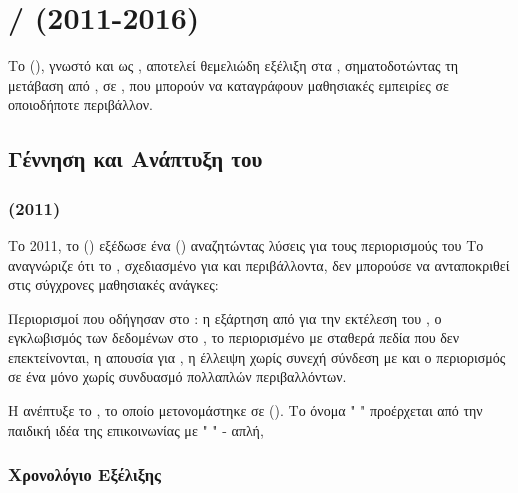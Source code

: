 \section{ /    (2011-2016)}
\label{sec:xapi_tincan}

Το   (), γνωστό και ως   , αποτελεί θεμελιώδη εξέλιξη στα  , σηματοδοτώντας τη μετάβαση από ,   σε ,   που μπορούν να καταγράφουν μαθησιακές εμπειρίες σε οποιοδήποτε περιβάλλον.
\subsection{Γέννηση και Ανάπτυξη του }
\label{subsec:xapi_genesis}

\subsubsection{   (2011)}

Το 2011, το    ()  εξέδωσε ένα \textit{  } () αναζητώντας λύσεις για τους περιορισμούς του  Το  αναγνώριζε ότι το , σχεδιασμένο για   και  περιβάλλοντα, δεν μπορούσε να ανταποκριθεί στις σύγχρονες μαθησιακές ανάγκες:

Περιορισμοί  που οδήγησαν στο : η εξάρτηση από   για την εκτέλεση του , ο εγκλωβισμός των δεδομένων στο , το περιορισμένο   με σταθερά πεδία που δεν επεκτείνονται, η απουσία   για   , η έλλειψη   χωρίς συνεχή σύνδεση με  και ο περιορισμός σε ένα μόνο   χωρίς συνδυασμό πολλαπλών περιβαλλόντων.

Η   ανέπτυξε το \textit{  }, το οποίο μετονομάστηκε σε   (). Το όνομα " " προέρχεται από την παιδική ιδέα της επικοινωνίας με "  " - απλή,  

\subsubsection{Χρονολόγιο Εξέλιξης}

